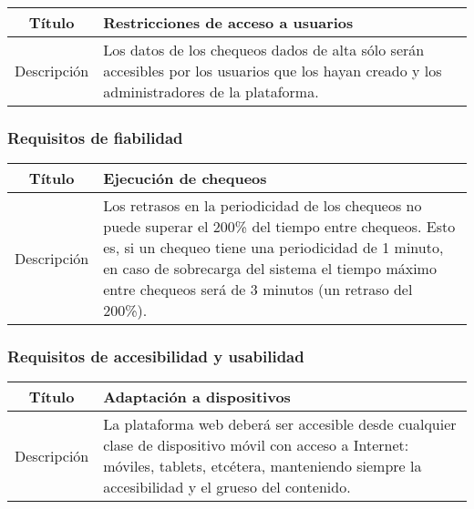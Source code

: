 \begin{center}
  
  \begin{tabularx}{\textwidth}{|c|X|}
    \hline
    Título & Restricciones de acceso a usuarios \\

    \hline

    Descripción & Los datos de los chequeos dados de alta sólo serán accesibles
    por los usuarios que los hayan creado y los administradores de la plataforma. \\


    \hline
  \end{tabularx}
\end{center}

\FloatBarrier
\subsubsection{Requisitos de fiabilidad}


\begin{center}
  
  \begin{tabularx}{\textwidth}{|c|X|}
    \hline
    Título & Ejecución de chequeos \\

    \hline

    Descripción & Los retrasos en la periodicidad de los chequeos no puede
    superar el 200\% del tiempo entre chequeos. Esto es, si un chequeo tiene una
    periodicidad de 1 minuto, en caso de sobrecarga del sistema el tiempo máximo
    entre chequeos será de 3 minutos (un retraso del 200\%). \\

    \hline
  \end{tabularx}
\end{center}


\FloatBarrier
\subsubsection{Requisitos de accesibilidad y usabilidad}

\begin{center}
  
  \begin{tabularx}{\textwidth}{|c|X|}
    \hline
    Título & Adaptación a dispositivos \\

    \hline

    Descripción & La plataforma web deberá ser accesible desde cualquier clase
    de dispositivo móvil con acceso a Internet: móviles, tablets, etcétera,
    manteniendo siempre la accesibilidad y el grueso del contenido. \\

    \hline
  \end{tabularx}
  \label{tab:accesibilidad}
\end{center}


